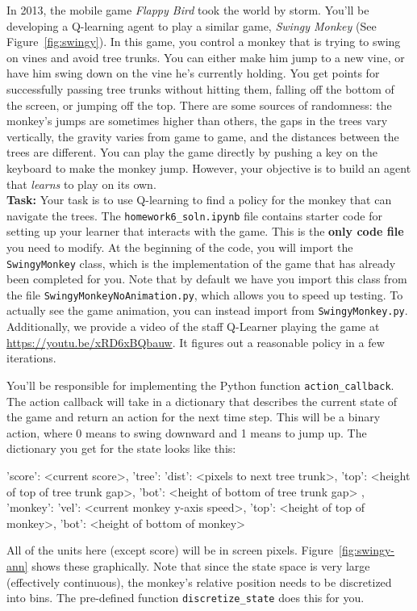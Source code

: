 \documentclass[submit]{../harvardml}
\begin{document}
\begin{problem}
    In 2013, the mobile game \emph{Flappy Bird} took the world by storm. You'll be developing a Q-learning agent to play a similar game, \emph{Swingy Monkey} (See Figure~\ref{fig:swingy}).  In this game, you control a monkey that is trying to swing on vines and avoid tree trunks.  You can either make him jump to a new vine, or have him swing down on the vine he's currently holding.  You get points for successfully passing tree trunks without hitting them, falling off the bottom of the screen, or jumping off the top.  There are some sources of randomness: the monkey's jumps are sometimes higher than others, the gaps in the trees vary vertically, the gravity varies from game to game, and the distances between the trees are different.  You can play the game directly by pushing a key on the keyboard to make the monkey jump.  However, your objective is to build an agent that \emph{learns} to play on its own. %
    \\
  
    \noindent \textbf{Task:} Your task is to use Q-learning to find a policy for the monkey that can navigate the trees.  The \verb|homework6_soln.ipynb| file contains starter code for setting up your learner that interacts with the game. This is the \textbf{only code file} you need to modify. At the beginning of the code, you will import the \verb|SwingyMonkey| class, which is the implementation of the game that has already been completed for you. Note that by default we have you import this class from the file \verb|SwingyMonkeyNoAnimation.py|, which allows you to speed up testing. To actually see the game animation, you can instead import from \verb|SwingyMonkey.py|. Additionally, we provide a video of the staff Q-Learner playing the game at \url{https://youtu.be/xRD6xBQbauw}. It figures out a reasonable policy in a few iterations. 
    
    You'll be responsible for implementing the Python function  \verb|action_callback|. The action callback will take in a dictionary that describes the current state of the game and return an action for the next time step. This will be a binary action, where 0 means to swing downward and 1 means to jump up. The dictionary you get for the state looks like this:
    \begin{csv}
    { 'score': <current score>,
      'tree': { 'dist': <pixels to next tree trunk>,
                'top':  <height of top of tree trunk gap>,
                'bot':  <height of bottom of tree trunk gap> },
      'monkey': { 'vel': <current monkey y-axis speed>,
                  'top': <height of top of monkey>,
                  'bot': <height of bottom of monkey> }}
    \end{csv}
    All of the units here (except score) will be in screen pixels. Figure~\ref{fig:swingy-ann} shows these graphically. Note that since the state space is very large (effectively continuous), the monkey's relative position needs to be discretized into bins. The pre-defined function \verb|discretize_state| does this for you. \\


\end{problem}
\end{document}
